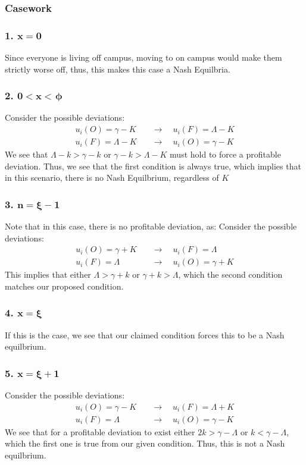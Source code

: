 \documentclass[12pt]{article}
\begin{document}
\subsubsection{Casework}
\subsubsection*{1. $\mathbf{x = 0}$}
Since everyone is living off campus, moving to on campus would make them strictly worse off, thus, this makes this case a Nash Equilbria. 
\subsubsection*{2. $\mathbf{0 < x <} \hspace{1pt} \bm{\phi}$}
Consider the possible deviations:
\begin{align*}
    u_i(O) = \gamma - K \quad &\to \quad u_i(F) = \Lambda - K \\
    u_i(F) = \Lambda - K\quad &\to \quad u_i(O) = \gamma - K
\end{align*}
We see that $\Lambda - k > \gamma - k$ or $\gamma - k > \Lambda - K$ must hold to force a profitable deviation. Thus, we see that the first condition is always true, which implies that in this scenario, there is no Nash Equilbrium, regardless of $K$
\subsubsection*{3. $\mathbf{n = \xi - 1}$} 
Note that in this case, there is no profitable deviation, as:
Consider the possible deviations:
\begin{align*}
    u_i(O) = \gamma + K \quad &\to \quad u_i(F) = \Lambda \\
    u_i(F) = \Lambda \quad &\to \quad u_i(O) = \gamma + K
\end{align*}
This implies that either $\Lambda > \gamma + k$ or $\gamma + k > \Lambda$, which the second condition matches our proposed condition. 
\subsubsection*{4. $\mathbf{x = \xi}$}
If this is the case, we see that our claimed condition forces this to be a Nash equilbrium. 
\subsubsection*{5. $\mathbf{x = \xi + 1}$}
Consider the possible deviations:
\begin{align*}
    u_i(O) = \gamma - K \quad &\to \quad u_i(F) = \Lambda + K \\
    u_i(F) = \Lambda \quad &\to \quad u_i(O) = \gamma - K
\end{align*}
We see that for a profitable deviation to exist either $2k > \gamma - \Lambda$ or $k < \gamma - \Lambda$, which the first one is true from our given condition. Thus, this is not a Nash equilbrium. 
\end{document}
